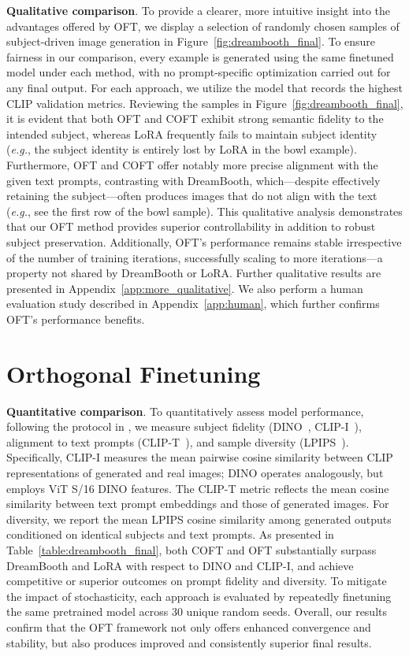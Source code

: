 \begin{itemize}[leftmargin=*,nosep]
\textbf{Qualitative comparison}. To provide a clearer, more intuitive insight into the advantages offered by OFT, we display a selection of randomly chosen samples of subject-driven image generation in Figure~\ref{fig:dreambooth_final}. To ensure fairness in our comparison, every example is generated using the same finetuned model under each method, with no prompt-specific optimization carried out for any final output. For each approach, we utilize the model that records the highest CLIP validation metrics. Reviewing the samples in Figure~\ref{fig:dreambooth_final}, it is evident that both OFT and COFT exhibit strong semantic fidelity to the intended subject, whereas LoRA frequently fails to maintain subject identity (\emph{e.g.}, the subject identity is entirely lost by LoRA in the bowl example). Furthermore, OFT and COFT offer notably more precise alignment with the given text prompts, contrasting with DreamBooth, which—despite effectively retaining the subject—often produces images that do not align with the text (\emph{e.g.}, see the first row of the bowl sample). This qualitative analysis demonstrates that our OFT method provides superior controllability in addition to robust subject preservation. Additionally, OFT's performance remains stable irrespective of the number of training iterations, successfully scaling to more iterations—a property not shared by DreamBooth or LoRA. Further qualitative results are presented in Appendix~\ref{app:more_qualitative}. We also perform a human evaluation study described in Appendix~\ref{app:human}, which further confirms OFT’s performance benefits.

\section{Orthogonal Finetuning}

\textbf{Quantitative comparison}. To quantitatively assess model performance, following the protocol in \cite{ruiz2023dreambooth}, we measure subject fidelity (DINO~\cite{caron2021emerging}, CLIP-I~\cite{radford2021learning}), alignment to text prompts (CLIP-T~\cite{radford2021learning}), and sample diversity (LPIPS~\cite{zhang2018unreasonable}). Specifically, CLIP-I measures the mean pairwise cosine similarity between CLIP representations of generated and real images; DINO operates analogously, but employs ViT S/16 DINO features. The CLIP-T metric reflects the mean cosine similarity between text prompt embeddings and those of generated images. For diversity, we report the mean LPIPS cosine similarity among generated outputs conditioned on identical subjects and text prompts. As presented in Table~\ref{table:dreambooth_final}, both COFT and OFT substantially surpass DreamBooth and LoRA with respect to DINO and CLIP-I, and achieve competitive or superior outcomes on prompt fidelity and diversity. To mitigate the impact of stochasticity, each approach is evaluated by repeatedly finetuning the same pretrained model across 30 unique random seeds. Overall, our results confirm that the OFT framework not only offers enhanced convergence and stability, but also produces improved and consistently superior final results.


\end{itemize}
